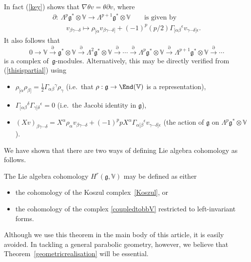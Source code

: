 In fact (\ref{key}) shows that $\nabla\theta v=\theta\partial v$, where
\begin{gather}
\partial: \ \Lambda^p{\mathfrak{g}}^*\otimes{\mathbb{V}}\to
\Lambda^{p+1}{\mathfrak{g}}^*\otimes{\mathbb{V}}
\qquad\mbox{is given by}\nonumber\\
\qquad
v_{\beta\gamma\cdots\delta}\mapsto\rho_{[\alpha}v_{\beta\gamma\cdots\delta]}
+(-1)^p(p/2)\Gamma_{[\alpha\beta}{}^\epsilon v_{\gamma\cdots\delta]\epsilon}.\label{thisispartial}
\end{gather}
It also follows that
\begin{equation}\label{Koszul}
0\to{\mathbb{V}}\stackrel{\partial}{\longrightarrow}
{\mathfrak{g}}^*\otimes{\mathbb{V}}\stackrel{\partial}{\longrightarrow}
\Lambda^2{\mathfrak{g}}^*\otimes{\mathbb{V}}
\stackrel{\partial}{\longrightarrow}\cdots\stackrel{\partial}{\longrightarrow}
\Lambda^p{\mathfrak{g}}^*\otimes{\mathbb{V}}
\stackrel{\partial}{\longrightarrow}
\Lambda^{p+1}{\mathfrak{g}}^*\otimes{\mathbb{V}}
\stackrel{\partial}{\longrightarrow}
\cdots\end{equation}
is a complex of~${\mathfrak{g}}$-modules. Alternatively, this may be directly
verif\/ied from (\ref{thisispartial}) using
\begin{itemize}\itemsep=0pt
\item
$\rho_{[\alpha}\rho_{\beta]}=\frac12\Gamma_{\alpha\beta}{}^\gamma\rho_\gamma$
(i.e.~that $\rho:{\mathfrak{g}}\to\End({\mathbb{V}})$ is a representation),
\item $\Gamma_{[\alpha\beta}{}^\delta\Gamma_{\gamma]\delta}{}^\epsilon=0$
(i.e.~the Jacobi identity in ${\mathfrak{g}}$),
\item $(Xv)_{\beta\gamma\cdots\delta}
=X^\alpha\rho_\alpha v_{\beta\gamma\cdots\delta}
+(-1)^ppX^\alpha\Gamma_{\alpha[\beta}{}^\epsilon
v_{\gamma\cdots\delta]\epsilon}$ (the action of ${\mathfrak{g}}$ on
$\Lambda^p{\mathfrak{g}}^*\otimes{\mathbb{V}}$).
\end{itemize}
We have shown that there are two ways of def\/ining Lie algebra cohomology as
follows.
\begin{theorem}\label{geometricrealisation} The Lie algebra cohomology
$H^r({\mathfrak{g}},{\mathbb{V}})$ may be defined as either
\begin{itemize}\itemsep=0pt
\item the cohomology of the Koszul complex~\eqref{Koszul}, or
\item the cohomology of the complex \eqref{coupledtobbV} restricted to
left-invariant forms.
\end{itemize}
\end{theorem}
\begin{remark} Although we use this theorem in the main body of this article,
it is easily avoided. In tackling a general parabolic geometry,
however, we believe that Theorem~\ref{geometricrealisation} will be essential.
\end{remark}

